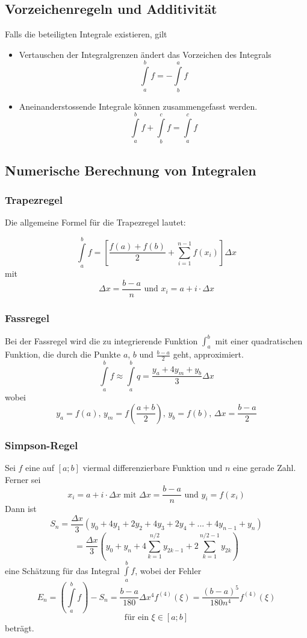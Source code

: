 \documentclass[10pt,a4paper]{scrartcl}
\begin{document}
\subsection{Vorzeichenregeln und Additivität}

Falls die beteiligten Integrale existieren, gilt
\begin{itemize}
\item Vertauschen der Integralgrenzen ändert das Vorzeichen des Integrals
$$\int\limits_a^b f = - \int\limits_b^a f$$
\item Aneinanderstossende Integrale können zusammengefasst werden.
$$\int\limits_a^b f + \int\limits_b^c f = \int\limits_a^c f$$
\end{itemize}


\subsection{Numerische Berechnung von Integralen}

\subsubsection{Trapezregel}

Die allgemeine Formel für die Trapezregel lautet:

$$\int\limits_a^b f = \left[\frac{f(a) + f(b)}{2} + \sum_{i=1}^{n-1} f(x_i)\right] \Delta x$$
mit
$$\Delta x = \frac{b-a}{n} \textrm{ und } x_i = a + i \cdot \Delta x$$

\subsubsection{Fassregel}

Bei der Fassregel wird die zu integrierende Funktion $\int_a^b$ mit einer quadratischen
Funktion, die durch die Punkte $a$, $b$ und $\frac{b-a}{2}$ geht, approximiert.
$$\int\limits_a^b f \approx \int\limits_a^b q = \frac{y_a + 4y_m + y_b}{3} \Delta x$$
wobei
$$y_a = f(a) \textrm{, } y_m = f\left(\frac{a+b}{2}\right) \textrm{, } y_b = f(b) \textrm{, } \Delta x = \frac{b-a}{2}$$

\subsubsection{Simpson-Regel}

Sei $f$ eine auf $[a;b]$ viermal differenzierbare Funktion und $n$ eine gerade Zahl.
Ferner sei
$$x_i = a + i \cdot \Delta x \textrm{ mit } \Delta x = \frac{b-a}{n}
    \textrm{ und } y_i = f(x_i)$$
Dann ist
$$S_n = \frac{\Delta x}{3}(y_0 + 4y_1 + 2y_2 + 4y_3 + 2y_4 + ... + 4y_{n-1} + y_n)$$
$$= \frac{\Delta x}{3}\left(y_0 + y_n + 4 \sum_{k=1}^{n/2} y_{2k-1} 
    + 2 \sum_{k=1}^{n/2-1} y_{2k}\right)$$
eine Schätzung für das Integral $\int\limits_a^b f$, wobei der Fehler
$$E_n = \left(\int\limits_a^b f\right) - S_n = \frac{b-a}{180}\Delta x^4 f^{(4)}(\xi)
    = \frac{(b-a)^5}{180n^4} f^{(4)}(\xi)$$
$$\textrm{für ein } \xi \in [a;b]$$
beträgt.
\end{document}
